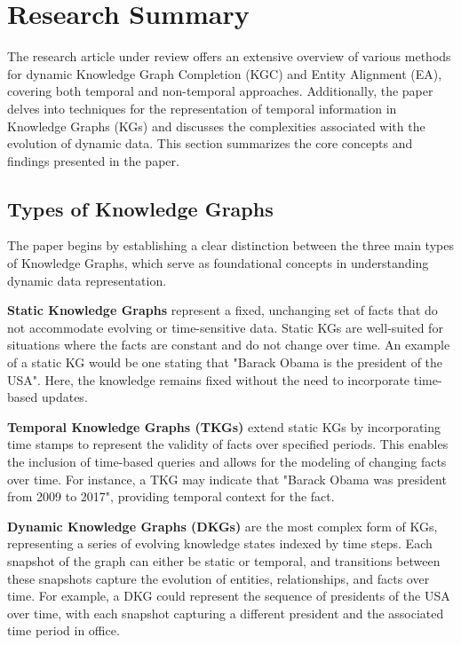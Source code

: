 \section{Research Summary}

The research article under review offers an extensive overview of various methods for dynamic Knowledge Graph Completion (KGC) and Entity Alignment (EA), covering both temporal and non-temporal approaches. Additionally, the paper delves into techniques for the representation of temporal information in Knowledge Graphs (KGs) and discusses the complexities associated with the evolution of dynamic data. This section summarizes the core concepts and findings presented in the paper.

\subsection{Types of Knowledge Graphs}

The paper begins by establishing a clear distinction between the three main types of Knowledge Graphs, which serve as foundational concepts in understanding dynamic data representation.

\textbf{Static Knowledge Graphs} represent a fixed, unchanging set of facts that do not accommodate evolving or time-sensitive data. Static KGs are well-suited for situations where the facts are constant and do not change over time. An example of a static KG would be one stating that "Barack Obama is the president of the USA". Here, the knowledge remains fixed without the need to incorporate time-based updates.

\textbf{Temporal Knowledge Graphs (TKGs)} extend static KGs by incorporating time stamps to represent the validity of facts over specified periods. This enables the inclusion of time-based queries and allows for the modeling of changing facts over time. For instance, a TKG may indicate that "Barack Obama was president from 2009 to 2017", providing temporal context for the fact.

\textbf{Dynamic Knowledge Graphs (DKGs)} are the most complex form of KGs, representing a series of evolving knowledge states indexed by time steps. Each snapshot of the graph can either be static or temporal, and transitions between these snapshots capture the evolution of entities, relationships, and facts over time. For example, a DKG could represent the sequence of presidents of the USA over time, with each snapshot capturing a different president and the associated time period in office.

